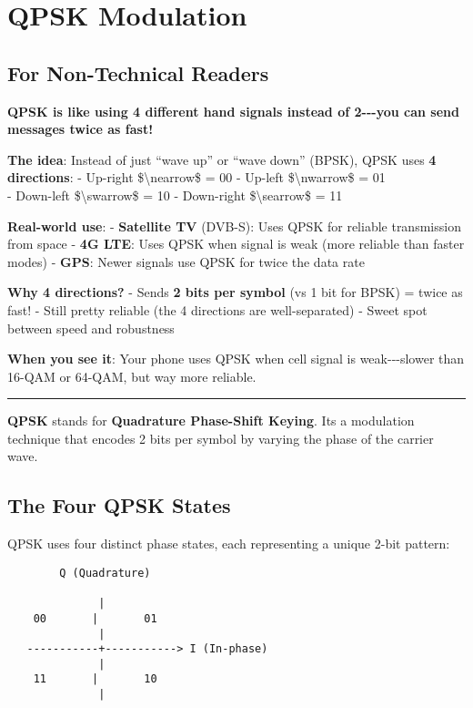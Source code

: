 \section{QPSK Modulation}\label{qpsk-modulation}

\subsection{\texorpdfstring{ For Non-Technical
Readers}{ For Non-Technical Readers}}\label{for-non-technical-readers}

\textbf{QPSK is like using 4 different hand signals instead of
2-\/-\/-you can send messages twice as fast!}

\textbf{The idea}: Instead of just ``wave up'' or ``wave down'' (BPSK),
QPSK uses \textbf{4 directions}: - Up-right \$\textbackslash nearrow\$ =
00 - Up-left \$\textbackslash nwarrow\$ = 01\\
- Down-left \$\textbackslash swarrow\$ = 10 - Down-right
\$\textbackslash searrow\$ = 11

\textbf{Real-world use}: - \textbf{Satellite TV} (DVB-S): Uses QPSK for
reliable transmission from space - \textbf{4G LTE}: Uses QPSK when
signal is weak (more reliable than faster modes) - \textbf{GPS}: Newer
signals use QPSK for twice the data rate

\textbf{Why 4 directions?} - Sends \textbf{2 bits per symbol} (vs 1 bit
for BPSK) = twice as fast! - Still pretty reliable (the 4 directions are
well-separated) - Sweet spot between speed and robustness

\textbf{When you see it}: Your phone uses QPSK when cell signal is
weak-\/-\/-slower than 16-QAM or 64-QAM, but way more reliable.

\begin{center}\rule{0.5\linewidth}{0.5pt}\end{center}

\textbf{QPSK} stands for \textbf{Quadrature Phase-Shift Keying}.
It\textquotesingle s a modulation technique that encodes 2 bits per
symbol by varying the phase of the carrier wave.

\subsection{The Four QPSK States}\label{the-four-qpsk-states}

QPSK uses four distinct phase states, each representing a unique 2-bit
pattern:

\begin{verbatim}
        Q (Quadrature)
              
              |
    00       |       01
              |
   -----------+-----------> I (In-phase)
              |
    11       |       10
              |
\end{verbatim}

